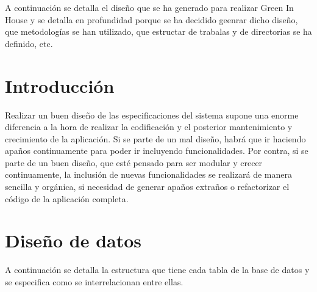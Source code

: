 
A continuación se detalla el diseño que se ha generado para realizar Green In House y se detalla en profundidad porque se ha decidido geenrar dicho diseño, que metodologías se han utilizado, que estructar de trabalas y de directorias se ha definido, etc.

\section{Introducción}
Realizar un buen diseño de las especificaciones del sistema supone una enorme diferencia a la hora de realizar la codificación y el posterior mantenimiento y crecimiento de la aplicación. Si se parte de un mal diseño, habrá que ir haciendo apaños continuamente para poder ir incluyendo funcionalidades. Por contra, si se parte de un buen diseño, que esté pensado para ser modular y crecer continuamente, la inclusión de nuevas funcionalidades se realizará de manera sencilla y orgánica, si necesidad de generar apaños extraños o refactorizar el código de la aplicación completa.

\section{Diseño de datos}

A continuación se detalla la estructura que tiene cada tabla de la base de datos y se especifica como se interrelacionan entre ellas. 

